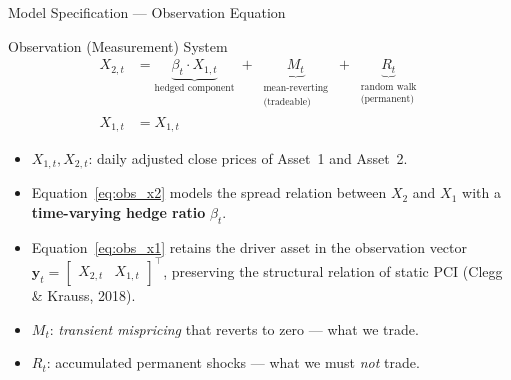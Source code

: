\documentclass[10pt, aspectratio=169]{beamer}
\begin{document}
\begin{frame}{Model Specification --- Observation Equation}
  \begin{block}{Observation (Measurement) System}
    \vspace{-4pt}
    \begin{align}
      X_{2,t} &= \underbrace{\beta_t \cdot X_{1,t}}_{\text{hedged component}}
               \;+\; \underbrace{M_t}_{\substack{\text{mean-reverting}\\\text{(tradeable)}}}
               \;+\; \underbrace{R_t}_{\substack{\text{random walk}\\\text{(permanent)}}}
               \label{eq:obs_x2}\\[4pt]
      X_{1,t} &= X_{1,t} \label{eq:obs_x1}
    \end{align}
  \end{block}
  \vspace{3pt}
  \begin{itemize}
    \item $X_{1,t}, X_{2,t}$: daily adjusted close prices of Asset~1 and Asset~2.
    \item Equation~\eqref{eq:obs_x2} models the spread relation between $X_2$ and $X_1$
          with a \textbf{time-varying hedge ratio} $\beta_t$.
    \item Equation~\eqref{eq:obs_x1} retains the driver asset in the observation vector
          $\bm{y}_t = \begin{bmatrix} X_{2,t} & X_{1,t} \end{bmatrix}^\top$, preserving the
          structural relation of static PCI (Clegg \& Krauss, 2018).
    \item $M_t$: \emph{transient mispricing} that reverts to zero --- what we trade.
    \item $R_t$: accumulated permanent shocks --- what we must \emph{not} trade.
  \end{itemize}
\end{frame}
\end{document}
